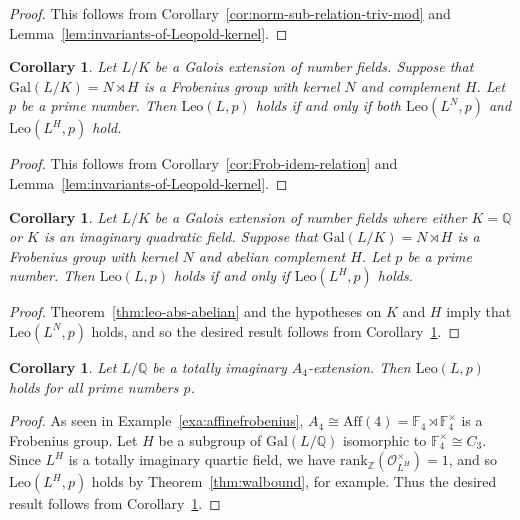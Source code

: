 \documentclass[12pt]{amsart}
\theoremstyle{plain}
\newtheorem{corollary}[theorem]{Corollary}
\theoremstyle{remark}
\theoremstyle{definition}
\newcommand{\Z}{\mathbb{Z}}
\newcommand{\Q}{\mathbb{Q}}
\newcommand{\F}{\mathbb{F}}
\newcommand{\Aff}{\mathrm{Aff}}
\newcommand{\Gal}{\mathrm{Gal}}
\newcommand{\rank}{\mathrm{rank}}
\newcommand{\Leo}{\mathrm{Leo}}
\numberwithin{equation}{section}
\begin{document}
\begin{proof}
This follows from Corollary~\ref{cor:norm-sub-relation-triv-mod} and 
Lemma~\ref{lem:invariants-of-Leopold-kernel}.
\end{proof}

\begin{corollary}\label{cor:Frobenius-reduction-for-Leo}
Let $L/K$ be a Galois extension of number fields.
Suppose that $\Gal(L/K) = N \rtimes H$ is a Frobenius group with kernel $N$ and complement $H$.
Let $p$ be a prime number.
Then $\Leo(L,p)$ holds if and only if both $\Leo(L^{N},p)$ and $\Leo(L^{H},p)$ hold.
\end{corollary}

\begin{proof}
This follows from Corollary~\ref{cor:Frob-idem-relation} and Lemma~\ref{lem:invariants-of-Leopold-kernel}.
\end{proof}

\begin{corollary}\label{cor:Frobenius-reduction-abelian}
Let $L/K$ be a Galois extension of number fields
where either $K=\Q$ or $K$ is an imaginary quadratic field.
Suppose that $\Gal(L/K) = N \rtimes H$ is a Frobenius group with kernel $N$ and abelian complement $H$.
Let $p$ be a prime number. 
Then $\Leo(L,p)$ holds if and only if $\Leo(L^{H},p)$ holds. 
\end{corollary}

\begin{proof}
Theorem~\ref{thm:leo-abs-abelian} and the hypotheses on $K$ and $H$ imply that $\Leo(L^{N},p)$ holds,
and so the desired result follows from Corollary~\ref{cor:Frobenius-reduction-for-Leo}.
\end{proof}

\begin{corollary}\cite{MR769790}\label{cor:A4-tot-complex}
Let $L/\Q$ be a totally imaginary $A_{4}$-extension.  
Then $\Leo(L,p)$ holds for all prime numbers $p$.
\end{corollary}

\begin{proof}
As seen in Example~\ref{exa:affinefrobenius}, 
$A_{4} \cong \Aff(4) = \F_{4} \rtimes \F_{4}^{\times}$ is a Frobenius group. 
Let $H$ be a subgroup of $\Gal(L/\Q)$ isomorphic to $\F_{4}^{\times} \cong C_{3}$.
Since $L^{H}$ is a totally imaginary quartic field,
we have $\rank_{\Z}(\mathcal{O}_{L^{H}}^{\times})=1$, and so $\Leo(L^{H},p)$ holds by 
Theorem~\ref{thm:walbound}, for example.
Thus the desired result follows from Corollary~\ref{cor:Frobenius-reduction-abelian}.
\end{proof}
\end{document}
